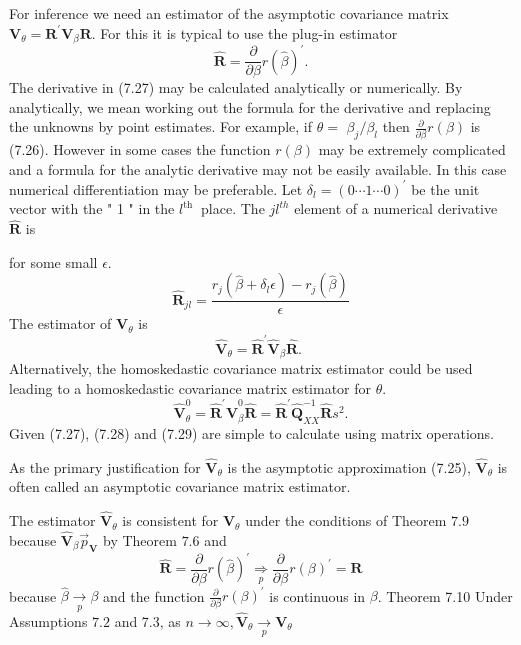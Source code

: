 \documentclass[10pt]{article}
\begin{document}
For inference we need an estimator of the asymptotic covariance matrix $\boldsymbol{V}_{\theta}=\boldsymbol{R}^{\prime} \boldsymbol{V}_{\beta} \boldsymbol{R}$. For this it is typical to use the plug-in estimator
$$
\widehat{\boldsymbol{R}}=\frac{\partial}{\partial \beta} r(\widehat{\beta})^{\prime} .
$$
The derivative in (7.27) may be calculated analytically or numerically. By analytically, we mean working out the formula for the derivative and replacing the unknowns by point estimates. For example, if $\theta=$ $\beta_{j} / \beta_{l}$ then $\frac{\partial}{\partial \beta} r(\beta)$ is (7.26). However in some cases the function $r(\beta)$ may be extremely complicated and a formula for the analytic derivative may not be easily available. In this case numerical differentiation may be preferable. Let $\delta_{l}=(0 \cdots 1 \cdots 0)^{\prime}$ be the unit vector with the " 1 " in the $l^{\text {th }}$ place. The $j l^{t h}$ element of a numerical derivative $\widehat{\boldsymbol{R}}$ is

for some small $\epsilon$.
$$
\widehat{\boldsymbol{R}}_{j l}=\frac{r_{j}\left(\widehat{\beta}+\delta_{l} \epsilon\right)-r_{j}(\widehat{\beta})}{\epsilon}
$$
The estimator of $\boldsymbol{V}_{\theta}$ is
$$
\widehat{\boldsymbol{V}}_{\theta}=\widehat{\boldsymbol{R}}^{\prime} \widehat{\boldsymbol{V}}_{\beta} \widehat{\boldsymbol{R}} \text {. }
$$
Alternatively, the homoskedastic covariance matrix estimator could be used leading to a homoskedastic covariance matrix estimator for $\theta$.
$$
\widehat{\boldsymbol{V}}_{\theta}^{0}=\widehat{\boldsymbol{R}}^{\prime} \widehat{\boldsymbol{V}}_{\beta}^{0} \widehat{\boldsymbol{R}}=\widehat{\boldsymbol{R}}^{\prime} \widehat{\boldsymbol{Q}}_{X X}^{-1} \widehat{\boldsymbol{R}} s^{2} .
$$
Given (7.27), (7.28) and (7.29) are simple to calculate using matrix operations.

As the primary justification for $\widehat{\boldsymbol{V}}_{\theta}$ is the asymptotic approximation (7.25), $\widehat{\boldsymbol{V}}_{\theta}$ is often called an asymptotic covariance matrix estimator.

The estimator $\widehat{\boldsymbol{V}}_{\theta}$ is consistent for $\boldsymbol{V}_{\theta}$ under the conditions of Theorem $7.9$ because $\widehat{\boldsymbol{V}}_{\beta} \vec{p}_{\boldsymbol{V}}$ by Theorem $7.6$ and
$$
\widehat{\boldsymbol{R}}=\frac{\partial}{\partial \beta} r(\widehat{\beta})^{\prime} \underset{p}{\Rightarrow} \frac{\partial}{\partial \beta} r(\beta)^{\prime}=\boldsymbol{R}
$$
because $\widehat{\beta} \underset{p}{\longrightarrow} \beta$ and the function $\frac{\partial}{\partial \beta} r(\beta)^{\prime}$ is continuous in $\beta$. Theorem 7.10 Under Assumptions $7.2$ and 7.3, as $n \rightarrow \infty, \widehat{\boldsymbol{V}}_{\theta} \underset{p}{\longrightarrow} \boldsymbol{V}_{\theta}$
\end{document}
